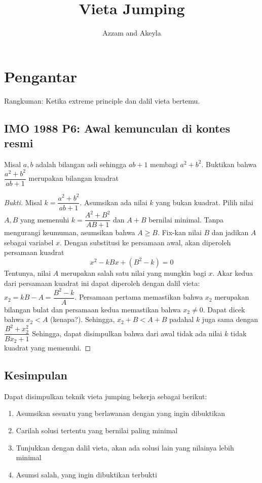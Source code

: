 \documentclass[11pt]{scrartcl}
\title{Vieta Jumping}
\author{Azzam and Akeyla}
\begin{document}
\maketitle

\renewcommand*\contentsname{Daftar Isi}
\tableofcontents

\newpage

\section{Pengantar}
Rangkuman: Ketika extreme principle dan dalil vieta bertemu.

\subsection{IMO 1988 P6: Awal kemunculan di kontes resmi}
\begin{problem}
    [IMO 1988] Misal $a, b$ adalah bilangan asli sehingga $ab + 1$ membagi $a^2 + b^2$. Buktikan bahwa $\dfrac{a^2 + b^2}{ab + 1}$ merupakan bilangan kuadrat
\end{problem}

\begin{proof}[Bukti]
    Misal $k = \dfrac{a^2 + b^2}{ab + 1}$. Asumsikan ada nilai $k$ yang bukan kuadrat. 
    Pilih nilai $A, B$ yang memenuhi $k = \dfrac{A^2 + B^2}{AB + 1}$ dan $A + B$ bernilai minimal. Tanpa mengurangi keumuman, asumsikan bahwa $A \geq B$.
    Fix-kan nilai $B$ dan jadikan $A$ sebagai variabel $x$. Dengan substitusi ke persamaan awal, akan diperoleh persamaan kuadrat \[x^2 - kBx + (B^2 - k) = 0\]
    Tentunya, nilai $A$ merupakan salah satu nilai yang mungkin bagi $x$. Akar kedua dari persamaan kuadrat ini dapat diperoleh dengan dalil vieta: $x_2 = kB - A = \dfrac{B^2 - k}{A}$. Persamaan pertama memastikan bahwa $x_2$ merupakan bilangan bulat dan persamaan kedua memastikan bahwa $x_2 \neq 0$.
    Dapat dicek bahwa $x_2 < A$ (kenapa?). Sehingga, $x_2 + B < A + B$ padahal $k$ juga sama dengan $\dfrac{B^2 + x_2^2}{Bx_2 + 1}$
    Sehingga, dapat disimpulkan bahwa dari awal tidak ada nilai $k$ tidak kuadrat yang memenuhi.
\end{proof}

\subsection{Kesimpulan}
Dapat disimpulkan teknik vieta jumping bekerja sebagai berikut:
\begin{enumerate}
    \item Asumsikan sesuatu yang berlawanan dengan yang ingin dibuktikan
    \item Carilah solusi tertentu yang bernilai paling minimal
    \item Tunjukkan dengan dalil vieta, akan ada solusi lain yang nilainya lebih minimal
    \item Asumsi salah, yang ingin dibuktikan terbukti
\end{enumerate}
\end{document}
